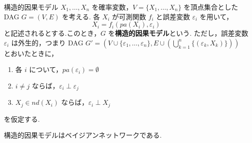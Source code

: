\documentclass[uplatex, dvipdfmx]{jsarticle}
\begin{document}
\begin{defn}{構造的因果モデル}
  $X_1, \dots, X_n$ を確率変数，$V = \{X_1, \dots, X_n\}$ を頂点集合とした DAG $G = (V, E)$ を考える.
  各 $X_i$ が可測関数 $f_i$ と誤差変数 $\varepsilon_i$ を用いて，
  \begin{equation}
    X_i = f_i(pa(X_i), \varepsilon_i)
  \end{equation}
  と記述されるとする.このとき，$G$ を\textbf{構造的因果モデル}という.
  ただし，誤差変数 $\varepsilon_i$ は外生的，つまり DAG $G' = (V \cup \{\varepsilon_1, \dots, \varepsilon_n\}, E \cup (\bigcup_{k=1}^n \{(\varepsilon_k, X_k)\})) $ とおいたときに，
  \begin{enumerate}
      \item 各 $i$ について，$pa(\varepsilon_i) = \emptyset$
      \item $i \neq j$ ならば，$\varepsilon_i \perp \varepsilon_j$
      \item $X_j \in nd(X_i)$ ならば，$\varepsilon_i \perp X_j$
  \end{enumerate}
  を仮定する.
\end{defn}

\begin{prop}[label={prop:SCM_is_BN}]{}
  構造的因果モデルはベイジアンネットワークである.
\end{prop}
\end{document}
